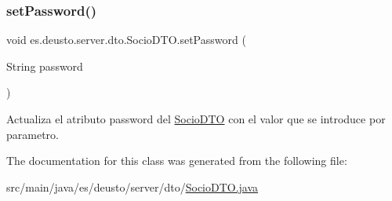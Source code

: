 \subsubsection{\texorpdfstring{setPassword()}{setPassword()}}
{\footnotesize\ttfamily void es.\+deusto.\+server.\+dto.\+Socio\+D\+T\+O.\+set\+Password (\begin{DoxyParamCaption}\item[{String}]{password }\end{DoxyParamCaption})}

Actualiza el atributo password del \mbox{\hyperlink{classes_1_1deusto_1_1server_1_1dto_1_1_socio_d_t_o}{Socio\+D\+TO}} con el valor que se introduce por parametro. 

The documentation for this class was generated from the following file\+:\begin{DoxyCompactItemize}
\item 
src/main/java/es/deusto/server/dto/\mbox{\hyperlink{_socio_d_t_o_8java}{Socio\+D\+T\+O.\+java}}\end{DoxyCompactItemize}
